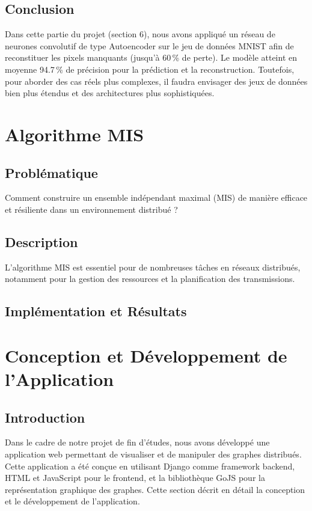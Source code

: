 \documentclass[a4paper,12pt]{article}
\begin{document}
\subsection*{Conclusion}
Dans cette partie du projet (section 6), nous avons appliqué un réseau de neurones convolutif de type Autoencoder sur le jeu de données MNIST afin de reconstituer les pixels manquants (jusqu’à 60\,\% de perte). Le modèle atteint en moyenne 94.7\,\% de précision pour la prédiction et la reconstruction. Toutefois, pour aborder des cas réels plus complexes, il faudra envisager des jeux de données bien plus étendus et des architectures plus sophistiquées.




\section{Algorithme MIS}
\subsection{Problématique}
Comment construire un ensemble indépendant maximal (MIS) de manière efficace et résiliente dans un environnement distribué ?
\subsection{Description}
L’algorithme MIS est essentiel pour de nombreuses tâches en réseaux distribués, notamment pour la gestion des ressources et la planification des transmissions.
\subsection{Implémentation et Résultats}




\section{Conception et Développement de l'Application}

\subsection{Introduction}
Dans le cadre de notre projet de fin d'études, nous avons développé une application web permettant de visualiser et de manipuler des graphes distribués. Cette application a été conçue en utilisant Django comme framework backend, HTML et JavaScript pour le frontend, et la bibliothèque GoJS pour la représentation graphique des graphes. Cette section décrit en détail la conception et le développement de l'application.
\end{document}
